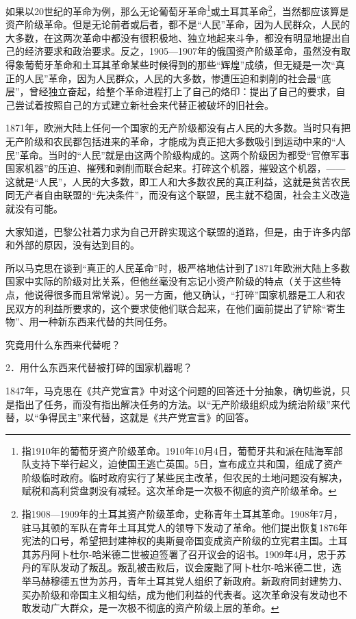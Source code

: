 \documentclass[UTF8, 12pt, a4paper]{ctexrep}
\begin{document}
如果以20世纪的革命为例，那么无论葡萄牙革命\footnote{指1910年的葡萄牙资产阶级革命。1910年10月4日，葡萄牙共和派在陆海军部队支持下举行起义，迫使国王逃亡英国。5日，宣布成立共和国，组成了资产阶级临时政府。临时政府实行了某些民主改革，但农民的土地问题没有解决，赋税和高利贷盘剥没有减轻。这次革命是一次极不彻底的资产阶级革命。}或土耳其革命\footnote{指1908—1909年的土耳其资产阶级革命，史称青年土耳其革命。1908年7月，驻马其顿的军队在青年土耳其党人的领导下发动了革命。他们提出恢复1876年宪法的口号，希望把封建神权的奥斯曼帝国变成资产阶级的立宪君主国。土耳其苏丹阿卜杜尔-哈米德二世被迫签署了召开议会的诏书。1909年4月，忠于苏丹的军队发动了叛乱。叛乱被击败后，议会废黜了阿卜杜尔-哈米德二世，选举马赫穆德五世为苏丹，青年土耳其党人组织了新政府。新政府同封建势力、买办阶级和帝国主义相勾结，成为他们利益的代表者。这次革命没有发动也不敢发动广大群众，是一次极不彻底的资产阶级上层的革命。}，当然都应该算是资产阶级革命。但是无论前者或后者，都不是“人民”革命，因为人民群众，人民的大多数，在这两次革命中都没有很积极地、独立地起来斗争，都没有明显地提出自己的经济要求和政治要求。反之，1905—1907年的俄国资产阶级革命，虽然没有取得象葡萄牙革命和土耳其革命某些时候得到的那些“辉煌”成绩，但无疑是一次“真正的人民”革命，因为人民群众，人民的大多数，惨遭压迫和剥削的社会最“底层”，曾经独立奋起，给整个革命进程打上了自己的烙印：提出了自己的要求，自己尝试着按照自己的方式建立新社会来代替正被破坏的旧社会。

1871年，欧洲大陆上任何一个国家的无产阶级都没有占人民的大多数。当时只有把无产阶级和农民都包括进来的革命，才能成为真正把大多数吸引到运动中来的“人民”革命。当时的“人民”就是由这两个阶级构成的。这两个阶级因为都受“官僚军事国家机器”的压迫、摧残和剥削而联合起来。打碎这个机器，摧毁这个机器，——这就是“人民”，人民的大多数，即工人和大多数农民的真正利益，这就是贫苦农民同无产者自由联盟的“先决条件”，而没有这个联盟，民主就不稳固，社会主义改造就没有可能。

大家知道，巴黎公社着力求为自己开辟实现这个联盟的道路，但是，由于许多内部和外部的原因，没有达到目的。

所以马克思在谈到“真正的人民革命”时，极严格地估计到了1871年欧洲大陆上多数国家中实际的阶级对比关系，但他丝毫没有忘记小资产阶级的特点（关于这些特点，他说得很多而且常常说）。另一方面，他又确认，“打碎”国家机器是工人和农民双方的利益所要求的，这个要求使他们联合起来，在他们面前提出了铲除“寄生物”、用一种新东西来代替的共同任务。

究竟用什么东西来代替呢？

2．用什么东西来代替被打碎的国家机器呢？

1847年，马克思在《共产党宣言》中对这个问题的回答还十分抽象，确切些说，只是指出了任务，而没有指出解决任务的方法。以“无产阶级组织成为统治阶级”来代替，以“争得民主”来代替，这就是《共产党宣言》的回答。
\end{document}
